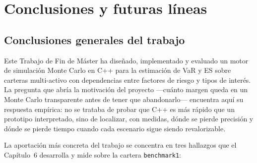 \documentclass[11pt]{article}
\begin{document}
\section{Conclusiones y futuras líneas}

\subsection{Conclusiones generales del trabajo}

Este Trabajo de Fin de Máster ha diseñado, implementado y evaluado un motor de simulación Monte Carlo en C++ para la estimación de VaR y ES sobre carteras multi-activo con dependencias entre factores de riesgo y tipos de interés.
La pregunta que abría la motivación del proyecto ---cuánto margen queda en un Monte Carlo transparente antes de tener que abandonarlo--- encuentra aquí su respuesta empírica: no se trataba de probar que C++ es más rápido que un prototipo interpretado, sino de localizar, con medidas, dónde se pierde precisión y dónde se pierde tiempo cuando cada escenario sigue siendo revalorizable.

La aportación más concreta del trabajo se concentra en tres hallazgos que el Capítulo~6 desarrolla y mide sobre la cartera \texttt{benchmark1}:
\end{document}
